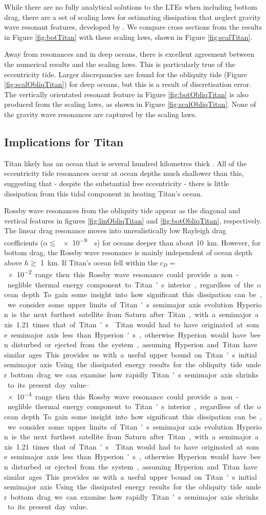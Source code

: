 While there are no fully analytical solutions to the LTEs when including bottom drag, there are a set of scaling laws for estimating dissipation that neglect gravity wave resonant features, developed by \citet{chen2013tidal}. We compare cross sections from the results in Figure \ref{fig:botTitan} with these scaling laws, shown in Figure \ref{fig:scalTitan}.

Away from resonances and in deep oceans, there is excellent agreement between the numerical results and the scaling laws. This is particularly true of the eccentricity tide. Larger discrepancies are found for the obliquity tide (Figure \ref{fig:scalObliqTitan}) for deep oceans, but this is a result of discretisation error. The vertically orientated resonant feature in Figure \ref{fig:botObliqTitan} is also produced from the scaling laws, as shown in Figure \ref{fig:scalObliqTitan}. None of the gravity wave resonances are captured by the scaling laws. 

\subsection{Implications for Titan}

Titan likely has an ocean that is several hundred kilometres thick \citep{sohl2003interior}. All of the eccentricity tide resonances occur at ocean depths much shallower than this, suggesting that - despite the substantial free eccentricity - there is little dissipation from this tidal component in heating Titan's ocean.

Rossby wave resonances from the obliquity tide appear as the diagonal and vertical features in figures \ref{fig:linObliqTitan} and \ref{fig:botObliqTitan}, respectively. The linear drag resonance moves into unrealistically low Rayleigh drag coefficients ($\alpha \lesssim$ \SI{e-9}{\per\second}) for oceans deeper than about \SI{10}{\kilo\metre}. However, for bottom drag, the Rossby wave resonance is mainly independent of ocean depth above $h \gtrsim$ \SI{1}{\kilo\metre}. If Titan's ocean fell within the $c_D =$ \SIrange{e-2}{e-4} range then this Rossby wave resonance could provide a non-neglible thermal energy component to Titan's interior, regardless of the ocean depth. To gain some insight into how significant this dissipation can be, we consider some upper limits of Titan's semimajor axis evolution.

Hyperion is the next furthest satellite from Saturn after Titan, with a semimajor axis  \num{1.21} times that of Titan's \citep{sears1995tidal}. Titan would had to have originated at some semimajor axis less than Hyperion's, otherwise Hyperion would have been disturbed or ejected from the system, assuming Hyperion and Titan have similar ages. This provides us with a useful upper bound on Titan's  initial semimajor axis. Using the dissipated energy results for the obliquity tide under bottom drag we can examine how rapidly Titan's semimajor axis shrinks to its present day value.

